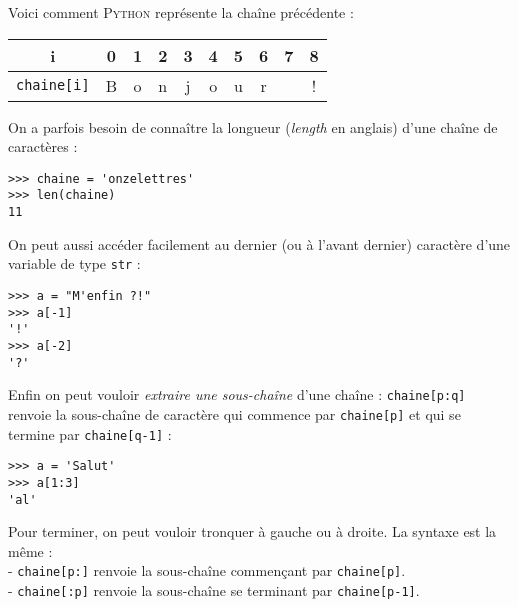 Voici comment \textsc{Python} représente  la chaîne précédente :

\begin{center}
    \alternaterowcolors
    \begin{tabular}{|c|c|c|c|c|c|c|c|c|c|}
        \hline
        i                        & 0 & 1 & 2 & 3 & 4 & 5 & 6 & 7 & 8 \\
        \hline
        \texttt{chaine[i]} & B & o & n & j & o & u & r &   & ! \\
        \hline
    \end{tabular}
\end{center}

On a parfois besoin de connaître la longueur (\emph{length} en anglais) d'une chaîne de caractères :

\begin{pys}\begin{verbatim}
>>> chaine = 'onzelettres'
>>> len(chaine)
11
\end{verbatim}
\end{pys}

On peut aussi accéder facilement au dernier (ou à l'avant dernier) caractère d'une variable de type \texttt{str} :

\begin{pys}\begin{verbatim}
>>> a = "M'enfin ?!"
>>> a[-1]
'!'
>>> a[-2]
'?'
\end{verbatim}
\end{pys}

Enfin on peut vouloir \textit{extraire une sous-chaîne} d'une chaîne : \texttt{chaine[p:q]} renvoie la sous-chaîne de caractère qui commence par
\texttt{chaine[p]} et qui se termine par \texttt{chaine[q-1]} :

\begin{pys}\begin{verbatim}
>>> a = 'Salut'
>>> a[1:3]
'al'
\end{verbatim}
\end{pys}

Pour terminer, on peut vouloir tronquer à gauche ou à droite. La syntaxe est la même :\\
- \texttt{chaine[p:]} renvoie la sous-chaîne commençant par \texttt{chaine[p]}.\\
-  \texttt{chaine[:p]} renvoie la sous-chaîne se terminant par \texttt{chaine[p-1]}.

